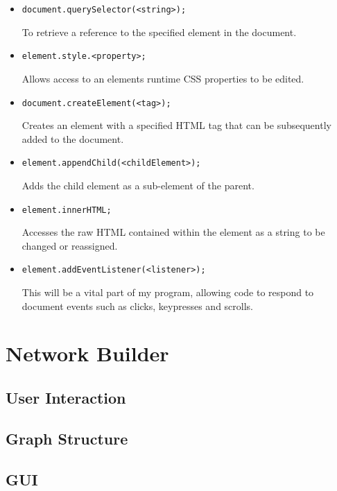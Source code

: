         \begin{itemize}
            \item \begin{lstlisting}
document.querySelector(<string>);\end{lstlisting}
To retrieve a reference to the specified element in the document.
            \item \begin{lstlisting}
element.style.<property>;\end{lstlisting}
Allows access to an elements runtime CSS properties to be edited.
            \item \begin{lstlisting}
document.createElement(<tag>);\end{lstlisting}
Creates an element with a specified HTML tag that can be subsequently added to the document.
            \item \begin{lstlisting}
element.appendChild(<childElement>);\end{lstlisting}
Adds the child element as a sub-element of the parent.
            \item \begin{lstlisting}
element.innerHTML;\end{lstlisting}
Accesses the raw HTML contained within the element as a string to be changed or reassigned.
            \item \begin{lstlisting}
element.addEventListener(<listener>);\end{lstlisting}
This will be a vital part of my program, allowing code to respond to document events such as clicks, keypresses and scrolls.
        \end{itemize}

\section{Network Builder}

    \subsection{User Interaction}

    \subsection{Graph Structure}

    \subsection{GUI}

